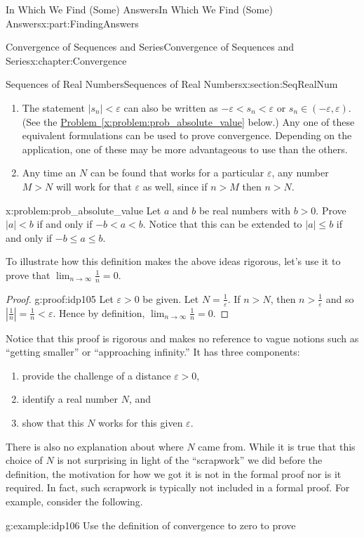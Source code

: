 \documentclass[oneside,10pt,]{book}
\newcommand{\xreffont}{\relax}
\numberwithin{equation}{section}
\newcommand{\eps}{\varepsilon}
\newcommand{\lt}{<}
\begin{document}
\begin{partptx}{In Which We Find (Some) Answers}{}{In Which We Find (Some) Answers}{}{}{x:part:FindingAnswers}
\begin{chapterptx}{Convergence of Sequences and Series}{}{Convergence of Sequences and Series}{}{}{x:chapter:Convergence}
\begin{sectionptx}{Sequences of Real Numbers}{}{Sequences of Real Numbers}{}{}{x:section:SeqRealNum}
\begin{enumerate}
\item{}The statement \(|s_n|\lt \eps\) can also be written as \(-\eps\lt s_n\lt \eps\) or \(s_n\in\left(-\eps,\eps\right)\). (See the \hyperref[x:problem:prob_absolute_value]{Problem~{\xreffont\ref{x:problem:prob_absolute_value}}} below.) Any one of these equivalent formulations can be used to prove convergence. Depending on the application, one of these may be more advantageous to use than the others.%
\item{}Any time an \(N\) can be found that works for a particular \(\eps\), any number \(M>N\) will work for that \(\eps\) as well, since if \(n>M\) then \(n>N\).%
\end{enumerate}
%
\begin{problem}{}{x:problem:prob_absolute_value}%
 Let \(a\) and \(b\) be real numbers with \(b>0\). Prove \(|a|\lt b\) if and only if \(-b\lt a\lt b\). Notice that this can be extended to \(|a|\leq b\) if and only if \(-b\leq a\leq b\).%
\end{problem}
To illustrate how this definition makes the above ideas rigorous, let's use it to prove that \(\displaystyle\lim_{n\rightarrow\infty}\frac{1}{n}=0\).%
\begin{proof}{}{g:proof:idp105}
Let \(\eps>0\) be given. Let \(N=\frac{1}{\eps}\). If \(n>N\), then \(n>\frac{1}{\eps}\) and so \(|\frac{1}{n}|=\frac{1}{n}\lt \eps\). Hence by definition, \(\lim_{n\rightarrow\infty}\frac{1}{n}=0\).%
\end{proof}
Notice that this proof is rigorous and makes no reference to vague notions such as ``getting smaller'' or ``approaching infinity.'' It has three components:%
\begin{enumerate}
\item{}provide the challenge of a distance \(\eps>0\),%
\item{}identify a real number \(N\), and%
\item{}show that this \(N\) works for this given \(\eps\).%
\end{enumerate}
There is also no explanation about where \(N\) came from. While it is true that this choice of \(N\) is not surprising in light of the ``scrapwork'' we did before the definition, the motivation for how we got it is not in the formal proof nor is it required.  In fact, such scrapwork is typically not included in a formal proof.  For example, consider the following.%
\begin{example}{}{g:example:idp106}%
Use the definition of convergence to zero to prove%
\begin{equation*}

\end{equation*}
\end{example}
\end{sectionptx}
\end{chapterptx}
\end{partptx}
\end{document}
